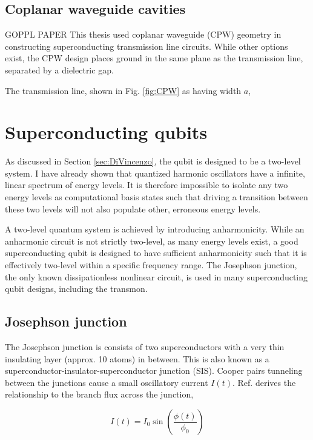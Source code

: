 \documentclass[11 pt, oneside]{book} %
\begin{document}
\subsection{Coplanar waveguide cavities}
GOPPL PAPER
This thesis used coplanar waveguide (CPW) geometry in constructing superconducting transmission line circuits. While other options exist, the CPW design places ground in the same plane as the transmission line, separated by a dielectric gap. 

The transmission line, shown in Fig. \ref{fig:CPW} as having width $a$, 


\section{Superconducting qubits}\label{sec:SuperconductingQubits}
As discussed in Section \ref{sec:DiVincenzo}, the qubit is designed to be a two-level system. I have already shown that quantized harmonic oscillators have a infinite, linear spectrum of energy levels. It is therefore impossible to isolate any two energy levels as computational basis states such that driving a transition between these two levels will not also populate other, erroneous energy levels. 

A two-level quantum system is achieved by introducing anharmonicity. While an anharmonic circuit is not strictly two-level, as many energy levels exist, a good superconducting qubit is designed to have sufficient anharmonicity such that it is effectively two-level within a specific frequency range. The Josephson junction\cite{Devoret2004}, the only known dissipationless nonlinear circuit, is used in many superconducting qubit designs, including the transmon. 
\subsection{Josephson junction}

The Josephson junction is consists of two superconductors with a very thin insulating layer (approx. 10 atoms) in between. This is also known as a superconductor-insulator-superconductor junction (SIS). Cooper pairs tunneling between the junctions cause a small oscillatory current $I(t)$. Ref. \cite{Tinkham} derives the relationship to the branch flux across the junction,

\begin{equation}
I(t)=I_0\sin\left(\frac{\phi(t)}{\phi_0}\right)
\end{equation}
\end{document}
